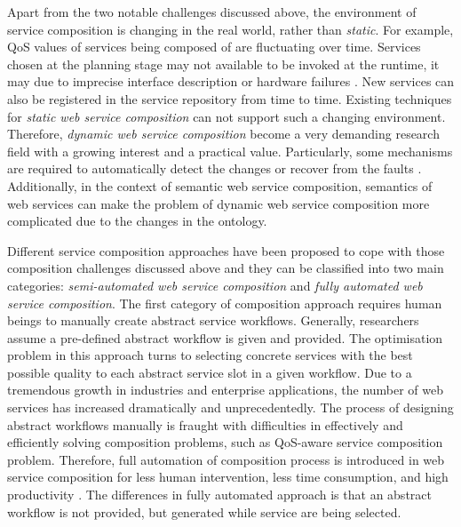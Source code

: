 Apart from the two notable challenges discussed above, the environment of service composition is changing in the real world, rather than \emph{static}. For example, QoS values of services being composed of are fluctuating over time. Services chosen at the planning stage may not available to be invoked at the runtime, it may due to imprecise interface description \cite{ishikawa2011bridging} or hardware failures \cite{guinard2009discovery}. New services can also be registered in the service repository from time to time. Existing techniques for \emph{static web service composition} can not support such a changing environment. Therefore, \emph{dynamic web service composition} become a very demanding research field with a growing interest and a practical value. Particularly, some mechanisms are required to automatically detect the changes or recover from the faults \cite{chan2009fault}. Additionally, in the context of semantic web service composition, semantics of web services can make the problem of dynamic web service composition more complicated due to the changes in the ontology.


Different service composition approaches \cite{da2016genetic,da2016particle,gupta2015optimization,lecue2009optimizing,ma2015hybrid,qi2010combining,rodriguez2010composition,yu2013adaptive,wang2014automated} have been proposed to cope with those composition challenges discussed above and they can be classified into two main categories: \emph{semi-automated web service composition} and \emph{fully automated web service composition}. The first category of composition approach requires human beings to manually create abstract service workflows. Generally, researchers assume a pre-defined abstract workflow is given and provided. The optimisation problem in this approach turns to selecting concrete services with the best possible quality to each abstract service slot in a given workflow. Due to a tremendous growth in industries and enterprise applications, the number of web services has increased dramatically and unprecedentedly. The process of designing abstract workflows  manually is fraught with difficulties in effectively and efficiently solving composition problems, such as QoS-aware service composition problem. Therefore, full automation of composition process is introduced in web service composition for less human intervention, less time consumption, and high productivity \cite{rao2004survey}. The differences in fully automated approach is that an abstract workflow is not provided, but generated while service are being selected. 


